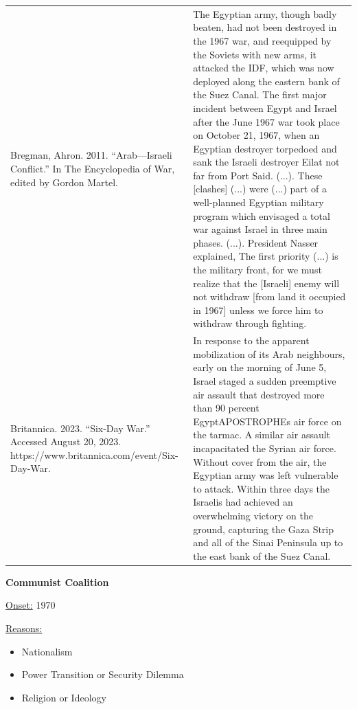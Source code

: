 {\begin{longtable}{p{}p{}}
\\
Bregman, Ahron. 2011. “Arab—Israeli Conflict.” In The Encyclopedia of War, edited by Gordon Martel. & The Egyptian army, though badly beaten, had not been destroyed in the 1967 war, and reequipped by the Soviets with new arms, it attacked the IDF, which was now deployed along the eastern bank of the Suez Canal. The first major incident between Egypt and Israel after the June 1967 war took place on October 21, 1967, when an Egyptian destroyer torpedoed and sank the Israeli destroyer Eilat not far from Port Said. (...).
These [clashes] (...) were (...) part of a well-planned Egyptian military program which envisaged a total war against Israel in three main phases. (...).
President Nasser explained, The first priority (...) is the military front, for we must realize that the [Israeli] enemy will not withdraw [from land it occupied in 1967] unless we force him to withdraw through fighting.
\\
Britannica. 2023. “Six-Day War.” Accessed August 20, 2023. https://www.britannica.com/event/Six-Day-War. & In response to the apparent mobilization of its Arab neighbours, early on the morning of June 5, Israel staged a sudden preemptive air assault that destroyed more than 90 percent EgyptAPOSTROPHEs air force on the tarmac. A similar air assault incapacitated the Syrian air force. Without cover from the air, the Egyptian army was left vulnerable to attack. Within three days the Israelis had achieved an overwhelming victory on the ground, capturing the Gaza Strip and all of the Sinai Peninsula up to the east bank of the Suez Canal.


\\
\end{longtable}}
\clearpage
         \textbf{Communist Coalition} 

          \underline{Onset:} 1970         

\underline{Reasons:}
\begin{itemize}
\item Nationalism
\item Power Transition or Security Dilemma
\item Religion or Ideology
\end{itemize}

